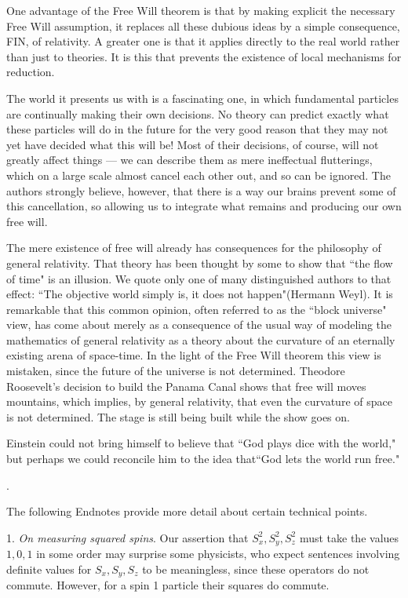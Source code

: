 \documentclass[12pt]{amsart}
\begin{document}
One advantage of the Free Will theorem is that by making explicit the necessary Free Will assumption, it replaces all these dubious ideas by a simple consequence, FIN, of relativity.  A greater one is that it applies directly to the real world rather than just to theories.  It is this that prevents the existence of local mechanisms for reduction.

The world it presents us with is a fascinating one, in which fundamental 
particles are continually making their own decisions. 
No theory can predict exactly what these 
particles will do in the future for the very good reason that 
they may not yet have decided what this will be!  Most of their
decisions, of course, will not greatly affect things --- we can 
describe them as mere ineffectual flutterings, which on a large 
scale almost cancel each other out, and so can be ignored.
The authors strongly believe, however, that there is a way our 
brains prevent some of this cancellation, so allowing us to 
integrate what remains and producing our own free will.

The mere existence of free will already has consequences for the philosophy of 
general relativity. That theory has been thought by some to show that ``the flow of time"
is an illusion. We quote only one of many distinguished authors to that
effect: ``The objective world simply is, it does not happen"(Hermann Weyl).
It is remarkable that this common opinion, often referred to as the ``block universe" view, has come about merely as a consequence of the usual way of modeling the mathematics of general relativity as a theory about the curvature of an eternally existing arena of space-time.  In the light of the Free Will theorem this view is mistaken, since the future of the universe is not determined. Theodore Roosevelt's decision to build the Panama Canal shows that free will moves mountains, which implies, by general relativity, that even the curvature of space is not determined. The stage is still being built while the show goes on.

Einstein could not bring himself to believe that ``God plays dice with the world,"
but perhaps we could reconcile him to the idea that``God lets the world run free."

. 

The following Endnotes provide more detail about certain technical points.

1.  {\it On measuring squared spins}.  Our assertion that 
$S_x^2, S_y^2, S_z^2$ must take the values $1,0,1$ in some order 
may surprise some physicists, who expect sentences involving 
definite values for $S_x,S_y,S_z$ to be meaningless, 
since these operators do not commute.  However, for a spin 1 
particle their squares do commute.
\end{document}
